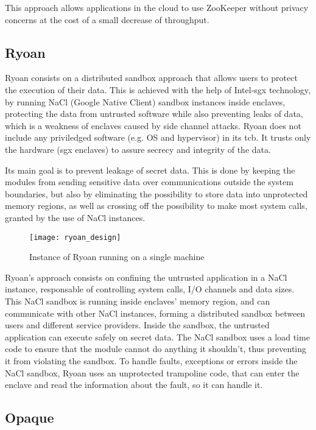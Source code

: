 This approach allows applications in the cloud to use ZooKeeper without privacy concerns at the cost of a small decrease of throughput.

\subsection{Ryoan}
\label{ssec:ryoan_sandboxing}

Ryoan \cite{ryoanPaper} consists on a distributed sandbox approach that allows users to protect the execution of their data. This is achieved with the help of Intel-\gls{sgx} \cite{intelSGX} \cite{sgxPaper} technology, by running NaCl (Google Native Client) sandbox instances inside enclaves, protecting the data from untrusted software while also preventing leaks of data, which is a weakness of enclaves caused by side channel attacks.
Ryoan does not include any priviledged software (e.g. OS and hypervisor) in its \gls{tcb}. It trusts only the hardware (\gls{sgx} enclaves) to assure secrecy and integrity of the data.

Its main goal is to prevent leakage of secret data. This is done by keeping the modules from sending sensitive data over communications outside the system boundaries, but also by eliminating the possibility to store data into unprotected memory regions, as well as crossing off the possibility to make most system calls, granted by the use of NaCl instances. 


\begin{figure}[htbp]
	\centering
	{\texttt{[image: ryoan\_design]}}
	\caption{Instance of Ryoan running on a single machine}
\end{figure}

Ryoan's approach consists on confining the untrusted application in a NaCl instance, responsable of controlling system calls, I/O channels and data sizes. This NaCl sandbox is running inside enclaves' memory region, and can communicate with other NaCl instances, forming a distributed sandbox between users and different service providers. Inside the sandbox, the untrusted application can execute safely on secret data. The NaCl sandbox uses a load time code to ensure that the module cannot do anything it shouldn't, thus preventing it from violating the sandbox. To handle faults, exceptions or errors inside the NaCl sandbox, Ryoan uses an unprotected trampoline code, that can enter the enclave and read the information about the fault, so it can handle it.
\subsection{Opaque}
\label{ssec:opaque}


